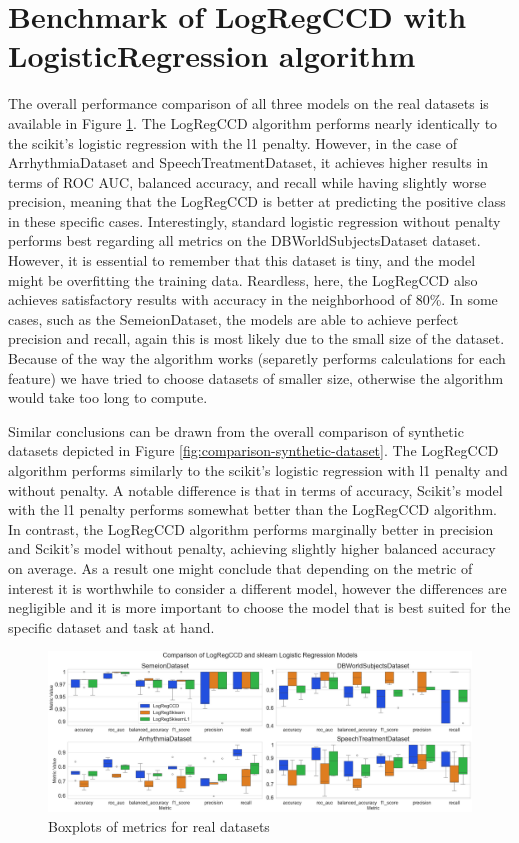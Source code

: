 \documentclass[11pt]{article}
\begin{document}
\section{Benchmark of LogRegCCD with LogisticRegression algorithm}

The overall performance comparison of all three models on the real datasets is available in Figure \ref{fig:real-data-boxplots}. The LogRegCCD algorithm performs nearly identically to the scikit's logistic regression with the l1 penalty. However, in the case of ArrhythmiaDataset and SpeechTreatmentDataset, it achieves higher results in terms of ROC AUC, balanced accuracy, and recall while having slightly worse precision, meaning that the LogRegCCD is better at predicting the positive class in these specific cases. Interestingly, standard logistic regression without penalty performs best regarding all metrics on the DBWorldSubjectsDataset dataset. However, it is essential to remember that this dataset is tiny, and the model might be overfitting the training data. Reardless, here, the LogRegCCD also achieves satisfactory results with accuracy in the neighborhood of 80\%. In some cases, such as the SemeionDataset, the models are able to achieve perfect precision and recall, again this is most likely due to the small size of the dataset. Because of the way the algorithm works (separetly performs calculations for each feature) we have tried to choose datasets of smaller size, otherwise the algorithm would take too long to compute.\par

Similar conclusions can be drawn from the overall comparison of synthetic datasets depicted in Figure \ref{fig:comparison-synthetic-dataset}. The LogRegCCD algorithm performs similarly to the scikit's logistic regression with l1 penalty and without penalty. A notable difference is that in terms of accuracy, Scikit's model with the l1 penalty performs somewhat better than the LogRegCCD algorithm. In contrast, the LogRegCCD algorithm performs marginally better in precision and Scikit's model without penalty, achieving slightly higher balanced accuracy on average. As a result one might conclude that depending on the metric of interest it is worthwhile to consider a different model, however the differences are negligible and it is more important to choose the model that is best suited for the specific dataset and task at hand. \par


\begin{figure}[h]
    \centering
  \includegraphics[width=\textwidth]{../results/real_data_boxplots.png}
    \caption{Boxplots of metrics for real datasets}
    \label{fig:real-data-boxplots}
  \end{figure}
\end{document}
